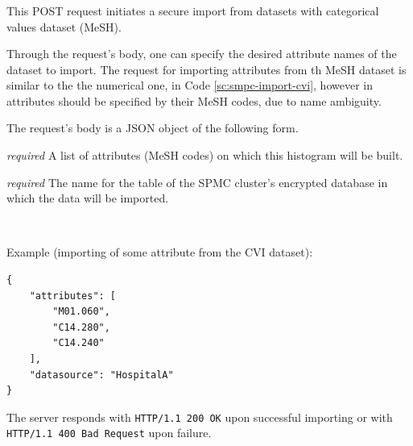 



\subsubsection[/smpc/import/categorical POST request]{\protect{}}\label{sss:post5}
This POST request initiates a secure import from datasets with categorical values dataset (MeSH).
\begin{description}[labelwidth=5em, leftmargin=\dimexpr\labelwidth+\labelsep\relax]
\item[Request:] Through the request's body, one can specify the desired attribute names of the dataset to import.
The request for importing attributes from th MeSH dataset is similar to the the numerical one, in Code \ref{sc:smpc-import-cvi}, however in attributes should be specified by their MeSH codes, due to name ambiguity.

The request's body is a JSON object of the following form.

\begin{description}[labelwidth=6em, leftmargin=\dimexpr\labelwidth+\labelsep\relax]

    \item[\texttt{attributes}:] {\color{red}\textit{required}} A list of attributes (MeSH codes) on which this histogram will be built.

    \item[\texttt{datasource}:] {\color{red}\textit{required}} The name for the table of the SPMC cluster's encrypted database in which the data  will be imported.

\end{description}

\ \\
\begin{minipage}{\linewidth}
  Example (importing of some attribute from the CVI dataset):\\
{
\begin{verbatim}
{
    "attributes": [
        "M01.060",
        "C14.280",
        "C14.240"
    ],
    "datasource": "HospitalA"
}
\end{verbatim}
\label{sc:smpc-import-mesh}
}
\end{minipage}

\item[Response:] The server responds with \texttt{HTTP/1.1 200 OK} upon successful importing or with \texttt{HTTP/1.1 400 Bad Request} upon failure.
\end{description}


